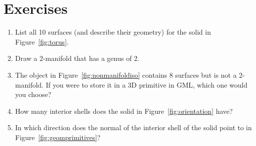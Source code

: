 %
\section{Exercises}

\begin{enumerate}
  \item List all 10 surfaces (and describe their geometry) for the solid in Figure~\ref{fig:torus}.
  \item Draw a 2-manifold that has a genus of 2.
  \item The object in Figure~\ref{fig:nonmanifoldiso} contains 8 surfaces but is not a 2-manifold. If you were to store it in a 3D primitive in GML, which one would you choose? 
  \item How many interior shells does the solid in Figure~\ref{fig:orientation} have?
  \item In which direction does the normal of the interior shell of the solid point to in Figure~\ref{fig:geomprimitives}?
\end{enumerate}
